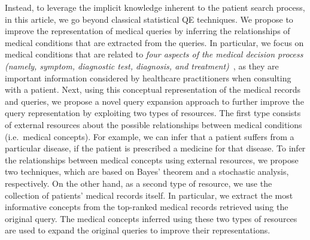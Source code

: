 \documentclass[1p]{elsarticle}
\begin{document}
 Instead, to leverage the implicit knowledge inherent to the patient search process, in this article, we go beyond classical statistical QE techniques. 
We propose to improve the representation of medical queries by inferring the relationships of medical conditions that are extracted from the queries. In particular, we focus on medical conditions that are related to \emph{four aspects of the medical decision process (namely, symptom, diagnostic test, diagnosis, and treatment)}~\cite{Silfen2006664,limsopatham2013oair,limsopatham2013ecir-b}, as they are important information considered by healthcare practitioners when consulting with a patient.
Next, using this conceptual representation of the medical records and queries, we propose a novel query expansion approach to further improve the query representation by exploiting two types of resources. The first type consists of external resources about the possible relationships between medical conditions (i.e.\ medical concepts). For example, we can infer that a patient suffers from a particular disease, if the patient is prescribed a medicine for that disease. To infer the relationships between medical concepts using external resources, we propose two techniques, which are based on Bayes' theorem and a stochastic analysis, respectively. On the other hand, as a second type of resource, we use the collection of patients' medical records itself. In particular, we extract the most informative concepts from the top-ranked medical records retrieved using the original query. The medical concepts inferred using these two types of resources are used to expand the original queries to improve their representations.
% 
\end{document}
